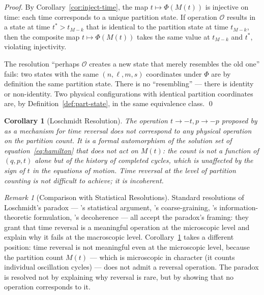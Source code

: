 \documentclass[twocolumn,10pt,a4paper]{article}
\theoremstyle{thmstyle}
\newtheorem{corollary}[theorem]{Corollary}
\theoremstyle{definition}
\theoremstyle{remark}
\newtheorem{remark}[theorem]{Remark}
\newcommand{\PhiMap}{\varPhi}
\begin{document}
\begin{proof}
By Corollary~\ref{cor:inject-time}, the map $t \mapsto \PhiMap(M(t))$ is injective on time: each time corresponds to a unique partition state. If operation $\mathcal{O}$ results in a state at time $t^* > t_{M-k}$ that is identical to the partition state at time $t_{M-k}$, then the composite map $t \mapsto \PhiMap(M(t))$ takes the same value at $t_{M-k}$ and $t^*$, violating injectivity.

The resolution ``perhaps $\mathcal{O}$ creates a new state that merely resembles the old one'' fails: two states with the same $(n, \ell, m, s)$ coordinates under $\PhiMap$ are by definition the same partition state. There is no ``resembling'' --- there is identity or non-identity. Two physical configurations with identical partition coordinates are, by Definition~\ref{def:part-state}, in the same equivalence class. \qed
\end{proof}

\begin{corollary}[Loschmidt Resolution]
\label{cor:loschmidt}
The operation $t \to -t, p \to -p$ proposed by \citet{loschmidt1876,loschmidt1877} as a mechanism for time reversal does not correspond to any physical operation on the partition count. It is a formal automorphism of the solution set of equation~\eqref{eq:hamilton} that does not act on $M(t)$: the count is not a function of $(q, p, t)$ alone but of the \emph{history} of completed cycles, which is unaffected by the sign of $t$ in the equations of motion. Time reversal at the level of partition counting is not difficult to achieve; it is incoherent.
\end{corollary}

\begin{remark}[Comparison with Statistical Resolutions]
Standard resolutions of Loschmidt's paradox --- \citet{boltzmann1877}'s statistical argument, \citet{gibbs1902}'s coarse-graining, \citet{jaynes1957}'s information-theoretic formulation, \citet{zurek1991}'s decoherence --- all accept the paradox's framing: they grant that time reversal is a meaningful operation at the microscopic level and explain why it fails at the macroscopic level. Corollary~\ref{cor:loschmidt} takes a different position: time reversal is not meaningful even at the microscopic level, because the partition count $M(t)$ --- which is microscopic in character (it counts individual oscillation cycles) --- does not admit a reversal operation. The paradox is resolved not by explaining why reversal is rare, but by showing that no operation corresponds to it.
\end{remark}
\end{document}

